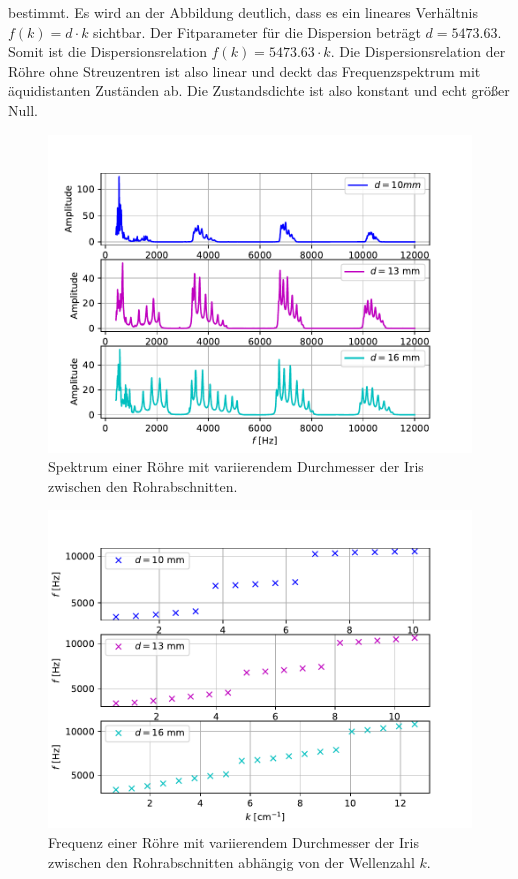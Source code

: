 bestimmt. Es wird an der Abbildung deutlich, dass es ein lineares Verhältnis $f(k)=d\cdot k$ sichtbar. Der Fitparameter für die Dispersion beträgt $d=5473.63$.
Somit ist die Dispersionsrelation $f(k)=5473.63\cdot k$. Die Dispersionsrelation der Röhre ohne Streuzentren ist also linear und deckt das Frequenzspektrum mit
äquidistanten Zuständen ab. Die Zustandsdichte ist also konstant und echt größer Null.
\begin{figure}
  \centering
  \includegraphics[scale=0.5]{Messwerte/plot6.pdf}
  \caption{Spektrum einer Röhre mit variierendem Durchmesser der Iris zwischen den Rohrabschnitten.}
  \label{fig:plot6}
\end{figure}
\begin{figure}
  \centering
  \includegraphics[scale=0.5]{Messwerte/plot7.pdf}
  \caption{Frequenz einer Röhre mit variierendem Durchmesser der Iris zwischen den Rohrabschnitten abhängig von der Wellenzahl $k$.}
  \label{fig:plot7}
\end{figure}
